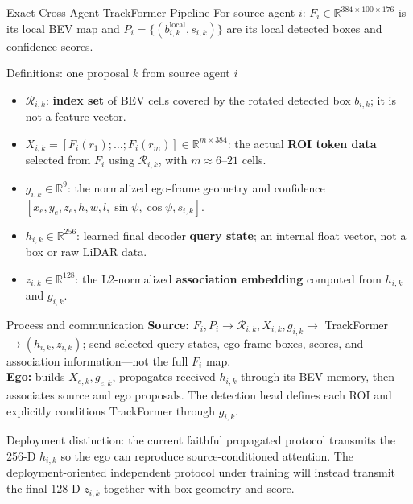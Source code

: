 \documentclass[aspectratio=169,10pt]{beamer}
\begin{document}
\begin{frame}{Exact Cross-Agent TrackFormer Pipeline}
\footnotesize
For source agent $i$: $F_i\in\mathbb{R}^{384\times100\times176}$ is its
local BEV map and $P_i=\{(b^{\mathrm{local}}_{i,k},s_{i,k})\}$ are its
local detected boxes and confidence scores.

\begin{block}{Definitions: one proposal $k$ from source agent $i$}
\begin{itemize}\setlength{\itemsep}{1pt}
  \item $\mathcal{R}_{i,k}$: \textbf{index set} of BEV cells covered by the
  rotated detected box $b_{i,k}$; it is not a feature vector.
  \item $X_{i,k}=[F_i(r_1);\ldots;F_i(r_m)]\in\mathbb{R}^{m\times384}$:
  the actual \textbf{ROI token data} selected from $F_i$ using $\mathcal{R}_{i,k}$,
  with $m\approx6$--$21$ cells.
  \item $g_{i,k}\in\mathbb{R}^{9}$: the normalized ego-frame geometry and
  confidence $[x_e,y_e,z_e,h,w,l,\sin\psi,\cos\psi,s_{i,k}]$.
  \item $h_{i,k}\in\mathbb{R}^{256}$: learned final decoder \textbf{query
  state}; an internal float vector, not a box or raw LiDAR data.
  \item $z_{i,k}\in\mathbb{R}^{128}$: the L2-normalized \textbf{association
  embedding} computed from $h_{i,k}$ and $g_{i,k}$.
\end{itemize}
\end{block}

\begin{block}{Process and communication}
\textbf{Source:} $F_i,P_i\rightarrow\mathcal{R}_{i,k},X_{i,k},g_{i,k}
\rightarrow$ TrackFormer $\rightarrow(h_{i,k},z_{i,k})$; send selected query
states, ego-frame boxes, scores, and association information---not the full
$F_i$ map.\\
\textbf{Ego:} builds $X_{e,k},g_{e,k}$, propagates received $h_{i,k}$ through
its BEV memory, then associates source and ego proposals. The detection head
defines each ROI and explicitly conditions TrackFormer through $g_{i,k}$.
\end{block}
\vspace{1mm}\scriptsize
\alert{Deployment distinction:} the current faithful propagated protocol
transmits the 256-D $h_{i,k}$ so the ego can reproduce source-conditioned
attention. The deployment-oriented independent protocol under training will
instead transmit the final 128-D $z_{i,k}$ together with box geometry and score.
\end{frame}
\end{document}
